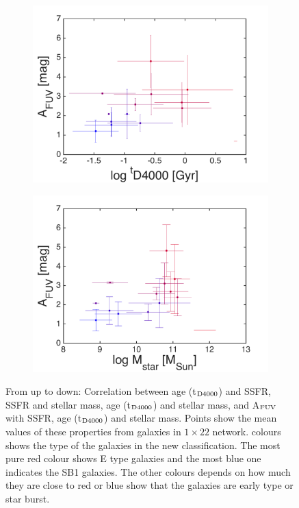 \begin{figure}
\begin{subfigure}[b]{0.3\textwidth}
            \includegraphics[width=\textwidth]{../images0.01/1d/f5.png}
        \end{subfigure}
       \hfill
        \begin{subfigure}[b]{0.3\textwidth}
            \includegraphics[width=\textwidth]{../images0.01/1d/f6.png}
        \end{subfigure}
        \caption{From up to down: Correlation between age (t$_{\rm {D4000}}$) and SSFR, SSFR and stellar mass, age (t$_{\rm {D4000}}$) and stellar mass, and A$_{\rm {FUV}}$ with SSFR, age (t$_{\rm {D4000}}$) and stellar mass. Points show the mean values of these properties from galaxies in $1\times22$ network. colours shows the type of the galaxies in the new classification. The most pure red colour shows E type galaxies and the most blue one indicates the SB1 galaxies. The other colours depends on how much they are close to red or blue show that the galaxies are early type or star burst.}
        \label{fig: props_vs_props}
    \end{figure}

